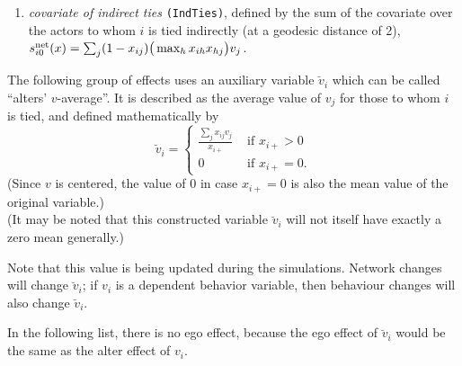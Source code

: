 \documentclass[a4paper,fleqn,11pt]{article}
\newcommand{\+}{\, + \,}
\newcommand{\vit}{\theenumi}
\newcounter{savenumi}
\begin{document}
\begin{enumerate}
 \item {\em covariate of indirect ties}
 \texttt{(IndTies)}, %
 defined by
 the sum of the covariate over the actors
 to whom $i$ is tied indirectly (at a geodesic distance of 2),\\
 $s^{\rm net}_{i\vit}(x) = \sum_j (1 -x_{ij})
                      \big( \max_h x_{ih}x_{hj} \big) v_j $.
\setcounter{savenumi}{\value{enumi}}
\end{enumerate}

\noindent
The following group of effects uses an auxiliary variable $\breve v_i$ which
can be called ``alters' $v$-average''.
It is described as the average value of $v_j$ for those
to whom $i$ is tied, and defined mathematically by
\begin{equation}
  \breve v_i = \left\{\begin{array}{ll} \displaystyle
         \frac{\sum_j x_{ij}v_j}{x_{i+}}  &  \text{ if } x_{i+} > 0     \\
         0                                &  \text{ if } x_{i+} = 0  .
  \end{array}   \right.            \label{alt_av}
\end{equation}
(Since $v$ is centered, the value of 0 in case $x_{i+} = 0$ is also the mean value
of the original variable.)\\
(It may be noted that this constructed variable $\breve v_i$
will not itself have exactly a zero mean generally.)

Note that this value is being updated during the simulations.
Network changes will change $\breve v_i$; if $v_i$ is a dependent behavior
variable, then behaviour changes will also change $\breve v_i$.

In the following list, there is no ego effect, because the ego effect
of $\breve v_i$ would be the same as the alter effect of $v_i$.
\end{document}
